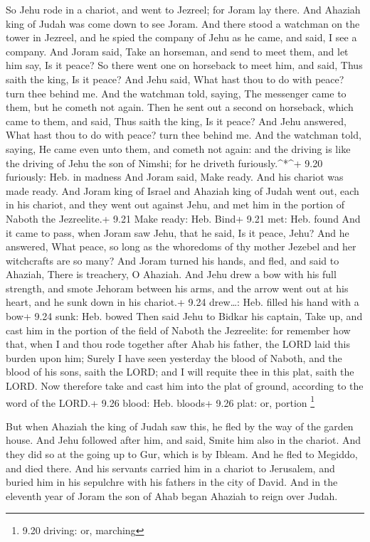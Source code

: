  So Jehu rode in a chariot, and went to Jezreel; for Joram
lay there. And Ahaziah king of Judah was come down to see Joram.
 And there stood a watchman on the tower in Jezreel, and he
spied the company of Jehu as he came, and said, I see a company. And
Joram said, Take an horseman, and send to meet them, and let him say, Is
it peace?  So there went one on horseback to meet him, and
said, Thus saith the king, Is it peace? And Jehu said, What hast thou to
do with peace? turn thee behind me. And the watchman told, saying, The
messenger came to them, but he cometh not again.  Then he
sent out a second on horseback, which came to them, and said, Thus saith
the king, Is it peace? And Jehu answered, What hast thou to do with
peace? turn thee behind me.  And the watchman told, saying,
He came even unto them, and cometh not again: and the driving is like
the driving of Jehu the son of Nimshi; for he driveth
furiously.\^{}*\^{}+ 9.20 furiously: Heb. in madness  And
Joram said, Make ready. And his chariot was made ready. And Joram king
of Israel and Ahaziah king of Judah went out, each in his chariot, and
they went out against Jehu, and met him in the portion of Naboth the
Jezreelite.+ 9.21 Make ready: Heb. Bind+ 9.21 met: Heb. found
 And it came to pass, when Joram saw Jehu, that he said, Is
it peace, Jehu? And he answered, What peace, so long as the whoredoms of
thy mother Jezebel and her witchcrafts are so many?  And
Joram turned his hands, and fled, and said to Ahaziah, There is
treachery, O Ahaziah.  And Jehu drew a bow with his full
strength, and smote Jehoram between his arms, and the arrow went out at
his heart, and he sunk down in his chariot.+ 9.24 drew\ldots: Heb.
filled his hand with a bow+ 9.24 sunk: Heb. bowed  Then
said Jehu to Bidkar his captain, Take up, and cast him in the portion of
the field of Naboth the Jezreelite: for remember how that, when I and
thou rode together after Ahab his father, the LORD laid this burden upon
him;  Surely I have seen yesterday the blood of Naboth, and
the blood of his sons, saith the LORD; and I will requite thee in this
plat, saith the LORD. Now therefore take and cast him into the plat of
ground, according to the word of the LORD.+ 9.26 blood: Heb. bloods+
9.26 plat: or, portion \footnote{9.20 driving: or, marching}

 But when Ahaziah the king of Judah saw this, he fled by
the way of the garden house. And Jehu followed after him, and said,
Smite him also in the chariot. And they did so at the going up to Gur,
which is by Ibleam. And he fled to Megiddo, and died there.
 And his servants carried him in a chariot to Jerusalem,
and buried him in his sepulchre with his fathers in the city of David.
 And in the eleventh year of Joram the son of Ahab began
Ahaziah to reign over Judah.

